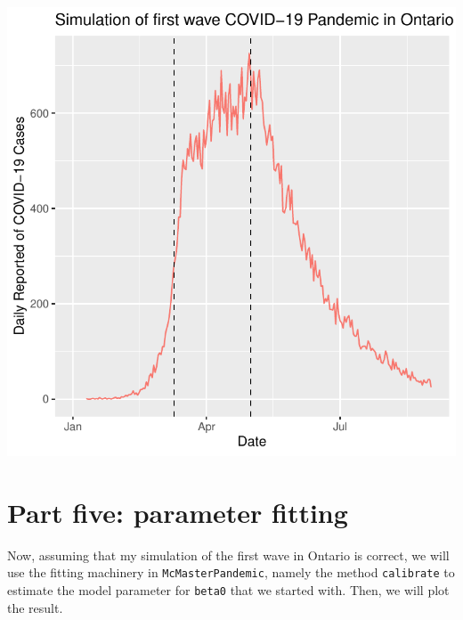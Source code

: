\documentclass{article}\usepackage[]{graphicx}\usepackage[]{color}
\makeatletter
\def\maxwidth{ %
  \ifdim\Gin@nat@width>\linewidth
    \linewidth
  \else
    \Gin@nat@width
  \fi
}
\newenvironment{knitrout}{}{} %
\makeatother
\begin{document}
\begin{knitrout}
\color{fgcolor}
\includegraphics[width=\maxwidth]{figure/init-1} 

\end{knitrout}


\section{Part five: parameter fitting}
Now, assuming that my simulation of the first wave in Ontario is correct, we will use the fitting machinery in \texttt{McMasterPandemic}, namely the method \texttt{calibrate} to estimate the model parameter for \texttt{beta0} that we started with. Then, we will plot the result.
\end{document}
